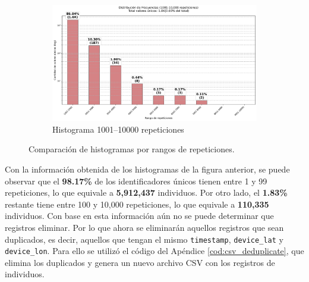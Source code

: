 \begin{figure}[htbp]
    \begin{subfigure}[t]{0.48\textwidth}
        \centering
        \includegraphics[width=\linewidth]{img/histograma_1k-10k_identifier_Mobility_Data_Slim.png}
        \caption{Histograma 1001–10000 repeticiones}
        \label{fig:sub3}
    \end{subfigure}

    \caption{Comparación de histogramas por rangos de repeticiones.}
    \label{fig:histogramas}
\end{figure}

Con la información obtenida de los histogramas de la figura anterior, se puede observar que el \textbf{98.17\%} de los identificadores únicos tienen entre 1 y 99 repeticiones, lo que equivale a \textbf{5,912,437} individuos. Por otro lado, el \textbf{1.83\%} restante tiene entre 100 y 10,000 repeticiones, lo que equivale a \textbf{110,335} individuos. Con base en esta información aún no se puede determinar que registros eliminar. Por lo que ahora se eliminarán aquellos registros que sean duplicados, es decir, aquellos que tengan el mismo \texttt{timestamp}, \texttt{device\_lat} y \texttt{device\_lon}. Para ello se utilizó el código del Apéndice \ref{cod:csv_deduplicate}, que elimina los duplicados y genera un nuevo archivo CSV con los registros de individuos. 

\newpage



